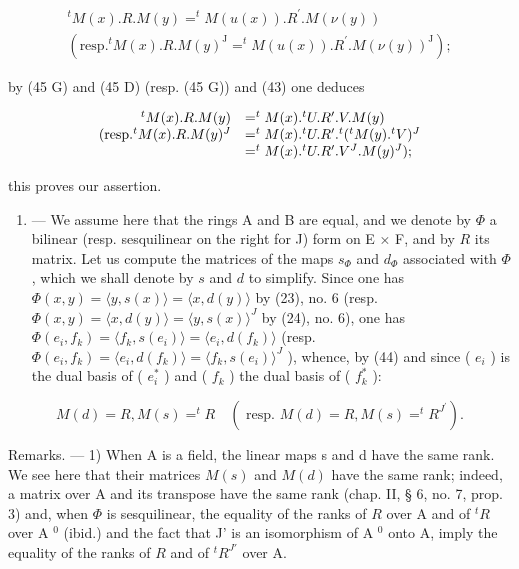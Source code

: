 \[
\begin{array}{c} ^ {t} M (x). R. M (y) = ^ {t} M (u (x)). R ^ {\prime}. M (\nu (y)) \\ (\text {resp.} ^ {t} M (x). R. M (y) ^ {\mathrm{J}} = ^ {t} M (u (x)). R ^ {\prime}. M (\nu (y)) ^ {\mathrm{J}}); \end{array}
\]

by (45 G) and (45 D) (resp. (45 G)) and (43) one deduces

\[
\begin{array}{r l} ^ {t} M (x). R. M (y) & = ^ {t} M (x). ^ {t} U. R ^ {\prime}. V. M (y) \\ (\text {resp.} ^ {t} M (x). R. M (y) ^ {J} & = ^ {t} M (x). ^ {t} U. R ^ {\prime}. ^ {t} (^ {t} M (y). ^ {t} V) ^ {J} \\ & = ^ {t} M (x). ^ {t} U. R ^ {\prime}. V ^ {J}. M (y) ^ {J}); \end{array}
\]

this proves our assertion.

\begin{enumerate}
\def\labelenumi{\Roman{enumi}.}
\setcounter{enumi}{3}
\tightlist
\item
  --- We assume here that the rings A and B are equal, and we denote by \(\Phi\) a bilinear (resp. sesquilinear on the right for J) form on E × F, and by \(R\) its matrix. Let us compute the matrices of the maps \(s_{\Phi}\) and \(d_{\Phi}\) associated with \(\Phi\) , which we shall denote by \(s\) and \(d\) to simplify. Since one has \(\Phi(x, y) = \langle y, s(x) \rangle = \langle x, d(y) \rangle\) by (23), no. 6 (resp. \(\Phi(x, y) = \langle x, d(y) \rangle = \langle y, s(x) \rangle^{J}\) by (24), no. 6), one has \(\Phi(e_i, f_k) = \langle f_k, s(e_i) \rangle = \langle e_i, d(f_k) \rangle\) (resp. \(\Phi(e_i, f_k) = \langle e_i, d(f_k) \rangle = \langle f_k, s(e_i) \rangle^{J}\) ), whence, by (44) and since ( \(e_i\) ) is the dual basis of ( \(e_i^*\) ) and ( \(f_k\) ) the dual basis of ( \(f_k^*\) ):
\end{enumerate}

\[
M (d) = R,   M (s) = ^ {t} R \quad (\text { resp. }   M (d) = R,   M (s) = ^ {t} R ^ {J ^ {\prime}}).\tag{49}
\]

Remarks. --- 1) When A is a field, the linear maps s and d have the same rank. We see here that their matrices \(M(s)\) and \(M(d)\) have the same rank; indeed, a matrix over A and its transpose have the same rank (chap. II, § 6, no. 7, prop. 3) and, when \(\Phi\) is sesquilinear, the equality of the ranks of \(R\) over A and of \(^tR\) over A \(^0\) (ibid.) and the fact that J' is an isomorphism of A \(^0\) onto A, imply the equality of the ranks of \(R\) and of \(^tR^{J'}\) over A.

